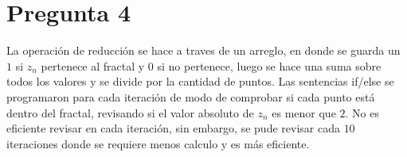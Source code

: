 \documentclass[12pt]{article}
\begin{document}
\section*{Pregunta 4}
La operación de reducción se hace a traves de un arreglo, en donde se guarda un $1$ si $z_n$ pertenece al fractal y $0$ si no pertenece, luego se hace una suma sobre todos los valores y se divide por la cantidad de puntos.
\newline
Las sentencias if/else se programaron para cada iteración de modo de comprobar si cada punto está dentro del fractal, revisando si el valor absoluto de $z_n$ es menor que $2$. No es eficiente revisar en cada iteración, sin embargo, se pude revisar cada $10$ iteraciones donde se requiere menos calculo y es más eficiente.



\end{document}
